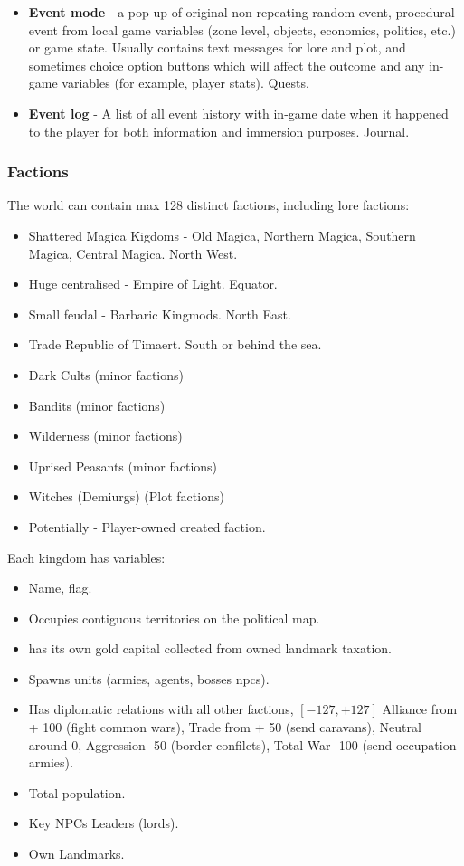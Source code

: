 \begin{itemize}
 \item \textbf{Event mode} - a pop-up of original non-repeating random event, procedural event from local game variables (zone level, objects, economics, politics, etc.) or game state. Usually contains text messages for lore and plot, and sometimes choice option buttons which will affect the outcome and any in-game variables (for example, player stats). Quests.
 
 \item  \textbf{Event log} - A list of all event history with in-game date when it happened to the player for both information and immersion purposes. Journal.
 
 \end{itemize}
 
\subsubsection{Factions}

The world can contain max 128 distinct factions, including lore factions:

\begin{itemize}
\item Shattered Magica Kigdoms - Old Magica, Northern Magica, Southern Magica, Central Magica. North West.
\item Huge centralised - Empire of Light. Equator.
\item Small feudal - Barbaric Kingmods. North East.
\item Trade Republic of Timaert. South or behind the sea.
\item Dark Cults (minor factions)
\item Bandits (minor factions)
\item Wilderness (minor factions) 
\item Uprised Peasants (minor factions)
\item Witches (Demiurgs) (Plot factions)
\item Potentially - Player-owned created faction.
\end{itemize}

Each kingdom has variables:

\begin{itemize}
\item Name, flag.
\item Occupies contiguous territories on the political map.
\item has its own gold capital collected from owned landmark taxation.
\item Spawns units (armies, agents, bosses npcs).
\item Has diplomatic relations with all other factions, $[-127, +127]$ Alliance from + 100 (fight common wars), Trade from + 50 (send caravans), Neutral around 0, Aggression -50 (border confilcts), Total War -100 (send occupation armies).
\item Total population.
\item Key NPCs Leaders (lords).
\item Own Landmarks.

\end{itemize}


